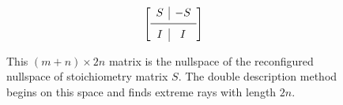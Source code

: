 \begin{figure}[t!]
\vspace{-0.3cm}
    \centering
    
        \[
        \left[ \begin{array}{c|c}
          S & -S \\
          \midrule
          I & I \\
        \end{array}\right]
        \]
        \vspace{-0.8cm}
        \caption{This $(m+n) \times 2n$ matrix is the nullspace of the reconfigured nullspace of stoichiometry matrix $S$. The double description method begins on this space and finds extreme rays with length $2n$.} 
        \label{fig:processing_space}
        \vspace{-0.5cm}
\end{figure}